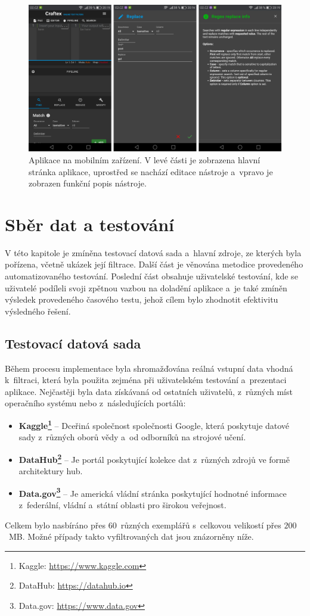 \begin{figure}[hbt]
	\centering
	\includegraphics[width=1\textwidth]{obrazky-figures/mobilni_verze.png}
	\caption{Aplikace na mobilním zařízení. V levé části je zobrazena hlavní stránka aplikace, uprostřed se nachází editace nástroje a~vpravo je zobrazen funkční popis nástroje.}
	\label{obr:Mobilní zobrazení}
\end{figure}

\chapter{Sběr dat a testování}
\label{chap:Sběr dat a testování}
V této kapitole je zmíněna testovací datová sada a~hlavní zdroje, ze kterých byla pořízena, včetně ukázek její filtrace. Další část je věnována metodice provedeného automatizovaného testování. Poslední část obsahuje uživatelské testování, kde se uživatelé podíleli svoji zpětnou vazbou na doladění aplikace a~je také zmíněn výsledek provedeného časového testu, jehož cílem bylo zhodnotit efektivitu výsledného řešení.

\section{Testovací datová sada}
Během procesu implementace byla shromažďována reálná vstupní data vhodná k~filtraci, která byla použita zejména při uživatelském testování a~prezentaci aplikace. Nejčastěji byla data získávaná od ostatních uživatelů, z~různých míst operačního systému nebo z~následujících portálů:
\begin{itemize}
    \item \textbf{Kaggle\footnote{Kaggle: \url{https://www.kaggle.com}}} -- Dceřiná společnost společnosti Google, která poskytuje datové sady z~různých oborů vědy a~od odborníků na strojové učení.
    \item \textbf{DataHub\footnote{DataHub: \url{https://datahub.io}}} -- Je portál poskytující kolekce dat z~různých zdrojů ve formě architektury hub.
    \item \textbf{Data.gov\footnote{Data.gov: \url{https://www.data.gov}}} -- Je americká vládní stránka poskytující hodnotné informace z~federální, vládní a~státní oblasti pro širokou veřejnost.
\end{itemize}
Celkem bylo nasbíráno přes $60$~různých exemplářů s~celkovou velikostí přes $200$~MB. Možné případy takto vyfiltrovaných dat jsou znázorněny níže.

